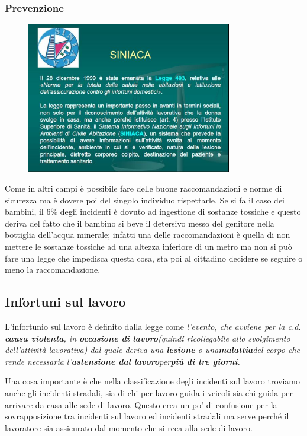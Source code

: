 \subsubsection{Prevenzione}

\begin{figure}[!ht]
\centering
	\includegraphics[width=0.8\textwidth]{28/image7.jpg}
	\end{figure}
	
Come in altri campi è possibile fare delle buone raccomandazioni e norme
di sicurezza ma è dovere poi del singolo individuo rispettarle. Se si fa
il caso dei bambini, il 6\% degli incidenti è dovuto ad ingestione di
sostanze tossiche e questo deriva del fatto che il bambino si beve il
detersivo messo del genitore nella bottiglia dell'acqua minerale;
infatti una delle raccomandazioni è quella di non mettere le sostanze
tossiche ad una altezza inferiore di un metro ma non si può fare una
legge che impedisca questa cosa, sta poi al cittadino decidere se
seguire o meno la raccomandazione.

\subsection{Infortuni sul lavoro}

L'infortunio sul lavoro è definito dalla legge come \emph{l'evento, che
avviene per la c.d. \textbf{causa violenta}, in \textbf{occasione di
lavoro}(quindi ricollegabile allo svolgimento dell'attività lavorativa)
dal quale deriva una \textbf{lesione} o una\textbf{malattia}del corpo
che rende necessaria l'\textbf{astensione dal lavoro}per\textbf{più di
tre giorni}.}

Una cosa importante è che nella classificazione degli incidenti sul
lavoro troviamo anche gli incidenti stradali, sia di chi per lavoro
guida i veicoli sia chi guida per arrivare da casa alle sede di lavoro.
Questo crea un po' di confusione per la sovrapposizione tra incidenti
sul lavoro ed incidenti stradali ma serve perché il lavoratore sia
assicurato dal momento che si reca alla sede di lavoro.


